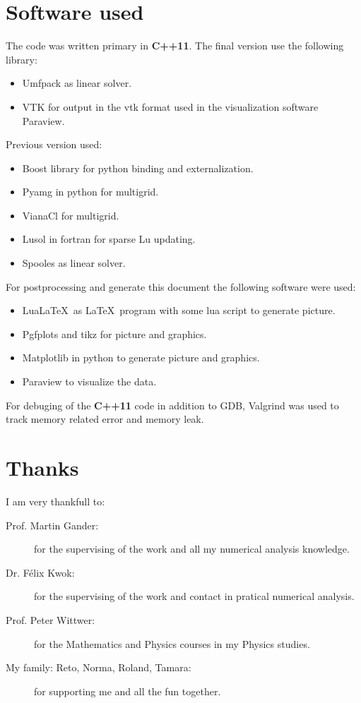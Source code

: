 \section{Software used}

The code was written primary in \textbf{C++11}.
The final version use the following library:
\begin{itemize}
 \item Umfpack as linear solver.
 \item VTK for output in the vtk format used in the visualization software Paraview.
\end{itemize}

Previous version used:
\begin{itemize}
 \item Boost library for python binding and externalization.
 \item Pyamg in python for multigrid.
 \item VianaCl for multigrid.
 \item Lusol in fortran for sparse Lu updating.
 \item Spooles as linear solver.
\end{itemize}

For postprocessing and generate this document the following software were used:
\begin{itemize}
 \item Lua\LaTeX \ as \LaTeX \ program with some lua script to generate picture.
 \item Pgfplots and tikz for picture and graphics.
 \item Matplotlib in python to generate picture and graphics.
 \item Paraview to visualize the data.
\end{itemize}

For debuging of the \textbf{C++11} code in addition to GDB, Valgrind was used to track memory
related error and memory leak.

\section{Thanks}

I am very thankfull to:
\begin{description}
 \item[Prof. Martin Gander:] for the supervising of the work and all my numerical analysis knowledge.
 \item[Dr. Félix Kwok:] for the supervising of the work and contact in pratical numerical analysis.
 \item[Prof. Peter Wittwer:] for the Mathematics and Physics courses in my Physics studies.
 \item[My family: Reto, Norma, Roland, Tamara:] for supporting me and all the fun together.
\end{description}

